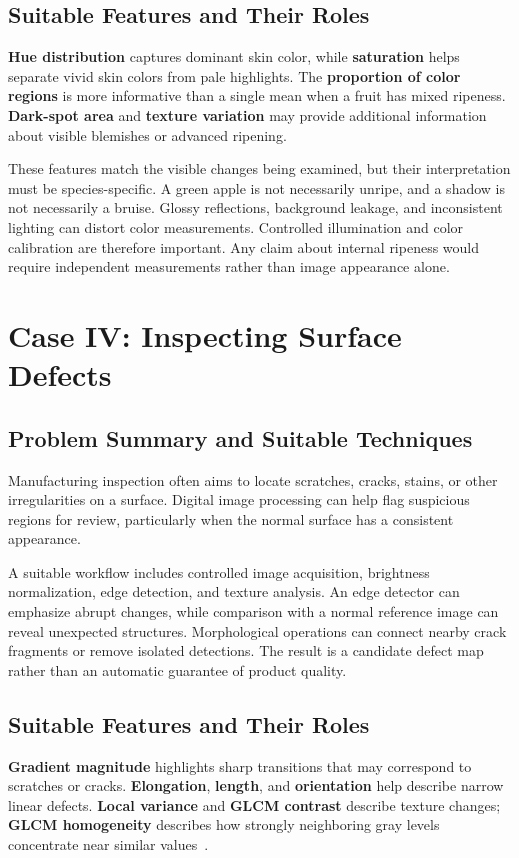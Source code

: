 \documentclass[conference]{IEEEtran}
\begin{document}
\subsection{Suitable Features and Their Roles}
\textbf{Hue distribution} captures dominant skin color, while \textbf{saturation} helps separate vivid skin colors from pale highlights. The \textbf{proportion of color regions} is more informative than a single mean when a fruit has mixed ripeness. \textbf{Dark-spot area} and \textbf{texture variation} may provide additional information about visible blemishes or advanced ripening.

These features match the visible changes being examined, but their interpretation must be species-specific. A green apple is not necessarily unripe, and a shadow is not necessarily a bruise. Glossy reflections, background leakage, and inconsistent lighting can distort color measurements. Controlled illumination and color calibration are therefore important. Any claim about internal ripeness would require independent measurements rather than image appearance alone.

\section{Case IV: Inspecting Surface Defects}
\subsection{Problem Summary and Suitable Techniques}
Manufacturing inspection often aims to locate scratches, cracks, stains, or other irregularities on a surface. Digital image processing can help flag suspicious regions for review, particularly when the normal surface has a consistent appearance.

A suitable workflow includes controlled image acquisition, brightness normalization, edge detection, and texture analysis. An edge detector can emphasize abrupt changes, while comparison with a normal reference image can reveal unexpected structures. Morphological operations can connect nearby crack fragments or remove isolated detections. The result is a candidate defect map rather than an automatic guarantee of product quality.

\subsection{Suitable Features and Their Roles}
\textbf{Gradient magnitude} highlights sharp transitions that may correspond to scratches or cracks. \textbf{Elongation}, \textbf{length}, and \textbf{orientation} help describe narrow linear defects. \textbf{Local variance} and \textbf{GLCM contrast} describe texture changes; \textbf{GLCM homogeneity} describes how strongly neighboring gray levels concentrate near similar values~\cite{haralick1973}.
\end{document}
